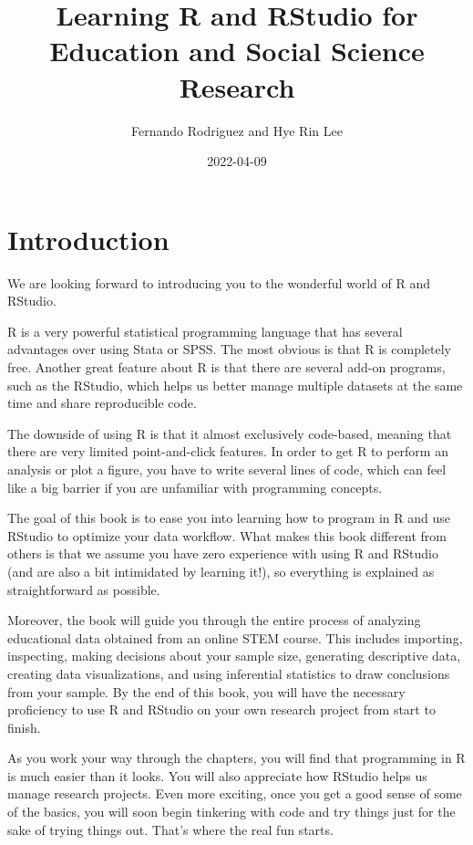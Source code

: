 \documentclass[
]{book}
\title{Learning R and RStudio for Education and Social Science Research}
\author{Fernando Rodriguez and Hye Rin Lee}
\date{2022-04-09}
\begin{document}
\maketitle

{
\setcounter{tocdepth}{1}
\tableofcontents
}
\hypertarget{introduction}{%
\chapter{Introduction}\label{introduction}}

We are looking forward to introducing you to the wonderful world of R and RStudio.

R is a very powerful statistical programming language that has several advantages over using Stata or SPSS. The most obvious is that R is completely free. Another great feature about R is that there are several add-on programs, such as the RStudio, which helps us better manage multiple datasets at the same time and share reproducible code.

The downside of using R is that it almost exclusively code-based, meaning that there are very limited point-and-click features. In order to get R to perform an analysis or plot a figure, you have to write several lines of code, which can feel like a big barrier if you are unfamiliar with programming concepts.

The goal of this book is to ease you into learning how to program in R and use RStudio to optimize your data workflow. What makes this book different from others is that we assume you have zero experience with using R and RStudio (and are also a bit intimidated by learning it!), so everything is explained as straightforward as possible.

Moreover, the book will guide you through the entire process of analyzing educational data obtained from an online STEM course. This includes importing, inspecting, making decisions about your sample size, generating descriptive data, creating data visualizations, and using inferential statistics to draw conclusions from your sample. By the end of this book, you will have the necessary proficiency to use R and RStudio on your own research project from start to finish.

As you work your way through the chapters, you will find that programming in R is much easier than it looks. You will also appreciate how RStudio helps us manage research projects. Even more exciting, once you get a good sense of some of the basics, you will soon begin tinkering with code and try things just for the sake of trying things out. That's where the real fun starts.
\end{document}
